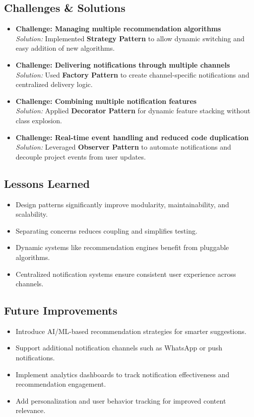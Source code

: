 \documentclass[a4paper,12pt]{report}
\begin{document}
\subsection*{Challenges \& Solutions}
\begin{itemize}[leftmargin=*]
    \item \textbf{Challenge: Managing multiple recommendation algorithms} \\
    \textit{Solution:} Implemented \textbf{Strategy Pattern} to allow dynamic switching and easy addition of new algorithms.
    \item \textbf{Challenge: Delivering notifications through multiple channels} \\
    \textit{Solution:} Used \textbf{Factory Pattern} to create channel-specific notifications and centralized delivery logic.
    \item \textbf{Challenge: Combining multiple notification features} \\
    \textit{Solution:} Applied \textbf{Decorator Pattern} for dynamic feature stacking without class explosion.
    \item \textbf{Challenge: Real-time event handling and reduced code duplication} \\
    \textit{Solution:} Leveraged \textbf{Observer Pattern} to automate notifications and decouple project events from user updates.
\end{itemize}

\subsection*{Lessons Learned}
\begin{itemize}[leftmargin=*]
    \item Design patterns significantly improve modularity, maintainability, and scalability.
    \item Separating concerns reduces coupling and simplifies testing.
    \item Dynamic systems like recommendation engines benefit from pluggable algorithms.
    \item Centralized notification systems ensure consistent user experience across channels.
\end{itemize}

\subsection*{Future Improvements}
\begin{itemize}[leftmargin=*]
    \item Introduce AI/ML-based recommendation strategies for smarter suggestions.
    \item Support additional notification channels such as WhatsApp or push notifications.
    \item Implement analytics dashboards to track notification effectiveness and recommendation engagement.
    \item Add personalization and user behavior tracking for improved content relevance.
\end{itemize}
\end{document}
